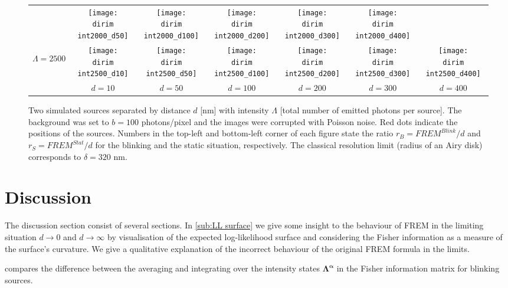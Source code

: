 \begin{figure}[!bt]
\begin{tabular}{c|cccccc}
		&\texttt{[image: \\dirim int2000\_d50]}
		&\texttt{[image: \\dirim int2000\_d100]}
		&\texttt{[image: \\dirim int2000\_d200]}
		&\texttt{[image: \\dirim int2000\_d300]}
		&\texttt{[image: \\dirim int2000\_d400]}\\
		\begin{sideways}\hspace{\vs cm}$\Lambda=2500$\end{sideways}
		&\texttt{[image: \\dirim int2500\_d10]}
		&\texttt{[image: \\dirim int2500\_d50]}
		&\texttt{[image: \\dirim int2500\_d100]}
		&\texttt{[image: \\dirim int2500\_d200]}
		&\texttt{[image: \\dirim int2500\_d300]}
		&\texttt{[image: \\dirim int2500\_d400]}\\		
		\hline	
		&$d=10$ & $d=50$ & $d=100$ & $d=200$ & $d=300$ & $d=400$\\
	\end{tabular}
	\caption{Two simulated sources separated by distance $d$ [nm] with intensity $\Lambda$ [total number of emitted photons per source]. The background was set to $b=100$ photons/pixel and the images were corrupted with Poisson noise. Red dots indicate the positions of the sources. Numbers in the top-left and bottom-left corner of each figure state the ratio $r_B=\unit{FREM}^{Blink}/d$ and $r_S=\unit{FREM}^{Stat}/d$ for the blinking and the static situation, respectively. The classical resolution limit (radius of an Airy disk) corresponds to $\delta=320$ nm.}
	\label{fig:two sources int d}
\end{figure}

\clearpage
\section{Discussion\label{sec:FREM discussion}}
The discussion section consist of several sections. In \autoref{sub:LL surface} we give some insight to the behaviour of FREM in the limiting situation $d\rightarrow0$ and $d\rightarrow\infty$ by visualisation of the expected log-likelihood surface and considering the Fisher information as a measure of the surface's curvature. We give a qualitative explanation of the incorrect behaviour of the original FREM formula in the limits.  

 compares the difference between the averaging and integrating over the intensity states $\bm{\Lambda^\alpha}$ in the Fisher information matrix for blinking sources.

